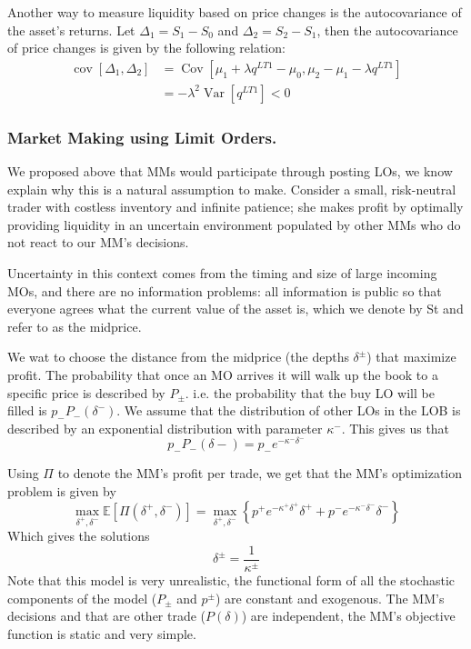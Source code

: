 \documentclass[11pt,a4paper]{article}
\theoremstyle{definition}
\theoremstyle{plain}
\theoremstyle{remark}
\renewcommand{\set}[1]{\left\{ #1 \right\}}
\newcommand{\1}{\mathbbm{1}}
\begin{document}
Another way to measure liquidity based on price changes is the autocovariance of the asset's returns. 
Let $\Delta_1 = S_1 - S_0$ and $\Delta_2 = S_2 - S_1$, then the autocovariance of price changes is given by the following relation: 
\begin{align*}
    \operatorname{cov} [\Delta_1, \Delta_2] &= \operatorname{Cov} [\mu_1 + \lambda q^{LT1} - \mu_0, \mu_2 - \mu_1 - \lambda q^{LT1}] \\
    &= - \lambda^2 \operatorname{Var} [q^{LT1}] < 0
\end{align*}

\subsubsection{Market Making using Limit Orders.}
We proposed above that MMs would participate through posting LOs, we know explain why this is a natural assumption to make. 
Consider a small, risk-neutral trader with costless inventory and infinite patience; she makes profit by optimally providing liquidity 
in an uncertain environment populated by other MMs who do not react to our MM's decisions. 

Uncertainty in this context comes from the timing and size of large incoming 
MOs, and there are no information problems: all information is public so that 
everyone agrees what the current value of the asset is, which we denote by St 
and refer to as the midprice.

We wat to choose the distance from the midprice (the depths $\delta^{\pm}$) that maximize profit. The probability 
that once an MO arrives it will walk up the book to a specific price is described by $P_{\pm}$. 
i.e. the probability that the buy LO will be filled is $p_- P_- (\delta^-)$. We assume that the 
distribution of other LOs in the LOB is described by an exponential distribution with parameter $\kappa^-$. 
This gives us that 
$$p_-P_-(\delta-) = p_- e^{- \kappa^- \delta^-}$$

Using $\Pi$ to denote the MM's profit per trade, we get that the MM's optimization problem is given by 
$$\max_{\delta^+, \delta^-} \mathbb{E} [\Pi(\delta^+, \delta^-)] = \max_{\delta^+, \delta^-} \set{p^+ e^{- \kappa^+ \delta^+} \delta^+ + p^- e^{- \kappa^- \delta^-} \delta^-}$$
Which gives the solutions 
$$\delta^{\pm} = \frac{1}{\kappa^\pm}$$
Note that this model is very unrealistic, the functional form of all the stochastic components of the model ($P_\pm$ and $p^\pm$)  
are constant and exogenous. The MM's decisions and that are other trade ($P(\delta)$) are independent, the MM's objective function is static and very simple. 
\end{document}
